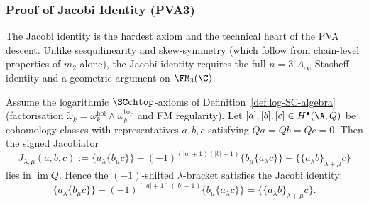\subsubsection{Proof of Jacobi Identity (PVA3)}

The Jacobi identity is the hardest axiom and the technical heart of the PVA descent. Unlike sesquilinearity and skew-symmetry (which follow from chain-level properties of $m_2$ alone), the Jacobi identity requires the full $n=3$ $A_\infty$ Stasheff identity and a geometric argument on $\FM_3(\C)$.

\begin{lemma}
Assume the logarithmic $\SCchtop$-axioms of
Definition~\ref{def:log-SC-algebra} (factorisation
$\widetilde\omega_k = \omega_k^{\mathrm{hol}} \wedge \omega_k^{\mathrm{top}}$
and FM regularity). Let $[a],[b],[c]\in H^\bullet(\A,Q)$ be cohomology classes with representatives $a,b,c$ satisfying $Qa=Qb=Qc=0$. Then the signed Jacobiator
\[
J_{\lambda,\mu}(a,b,c)
:=
\{a_\lambda\{b_\mu c\}\}
-
(-1)^{(|a|+1)(|b|+1)}\{b_\mu\{a_\lambda c\}\}
-
\{\{a_\lambda b\}_{\lambda+\mu}c\}
\]
lies in \(\operatorname{im}Q\). Hence the $(-1)$-shifted $\lambda$-bracket satisfies the Jacobi identity:
\begin{equation}
\{a_\lambda \{b_\mu c\}\} - (-1)^{(|a|+1)(|b|+1)} \{b_\mu \{a_\lambda c\}\} = \{\{a_\lambda b\}_{\lambda+\mu} c\}.
\end{equation}
\end{lemma}

